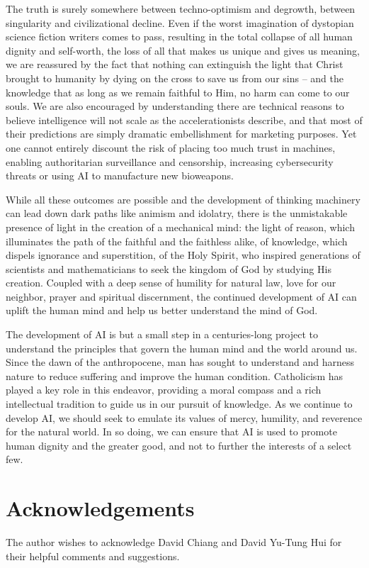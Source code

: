 \documentclass[sigplan,nonacm]{acmart}\settopmatter{printfolios=false,printccs=false,printacmref=false}
\begin{document}
The truth is surely somewhere between techno-optimism and degrowth, between singularity and civilizational decline. Even if the worst imagination of dystopian science fiction writers comes to pass, resulting in the total collapse of all human dignity and self-worth, the loss of all that makes us unique and gives us meaning, we are reassured by the fact that nothing can extinguish the light that Christ brought to humanity by dying on the cross to save us from our sins -- and the knowledge that as long as we remain faithful to Him, no harm can come to our souls. We are also encouraged by understanding there are technical reasons to believe intelligence will not scale as the accelerationists describe, and that most of their predictions are simply dramatic embellishment for marketing purposes. Yet one cannot entirely discount the risk of placing too much trust in machines, enabling authoritarian surveillance and censorship, increasing cybersecurity threats or using AI to manufacture new bioweapons.

While all these outcomes are possible and the development of thinking machinery can lead down dark paths like animism and idolatry, there is the unmistakable presence of light in the creation of a mechanical mind: the light of reason, which illuminates the path of the faithful and the faithless alike, of knowledge, which dispels ignorance and superstition, of the Holy Spirit, who inspired generations of scientists and mathematicians to seek the kingdom of God by studying His creation. Coupled with a deep sense of humility for natural law, love for our neighbor, prayer and spiritual discernment, the continued development of AI can uplift the human mind and help us better understand the mind of God.

The development of AI is but a small step in a centuries-long project to understand the principles that govern the human mind and the world around us. Since the dawn of the anthropocene, man has sought to understand and harness nature to reduce suffering and improve the human condition. Catholicism has played a key role in this endeavor, providing a moral compass and a rich intellectual tradition to guide us in our pursuit of knowledge. As we continue to develop AI, we should seek to emulate its values of mercy, humility, and reverence for the natural world. In so doing, we can ensure that AI is used to promote human dignity and the greater good, and not to further the interests of a select few.

\section{Acknowledgements}

The author wishes to acknowledge David Chiang and David Yu-Tung Hui for their helpful comments and suggestions.

\end{document}
